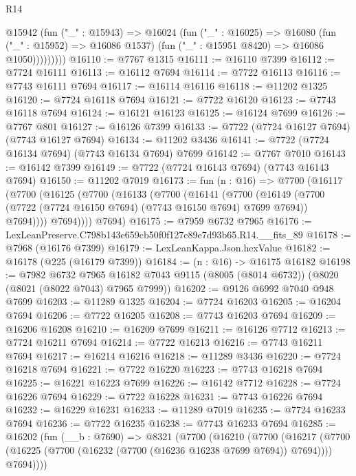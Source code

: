 \begin{lexlean}{R14}
\begin{coremodule}
              @15942
                (fun ("_" : @15943) =>
                @16024
                  (fun ("_" : @16025) =>
                  @16080
                    (fun ("_" : @15952) => @16086 @1537)
                    (fun ("_" : @15951 @8420) => @16086 @1050)))))))))
@16110 := @7767 @1315
@16111 := @16110 @7399
@16112 := @7724 @16111
@16113 := @16112 @7694
@16114 := @7722 @16113
@16116 := @7743 @16111 @7694
@16117 := @16114 @16116
@16118 := @11202 @1325
@16120 := @7724 @16118 @7694
@16121 := @7722 @16120
@16123 := @7743 @16118 @7694
@16124 := @16121 @16123
@16125 := @16124 @7699
@16126 := @7767 @801
@16127 := @16126 @7399
@16133 := @7722 (@7724 @16127 @7694) (@7743 @16127 @7694)
@16134 := @11202 @3436
@16141 := @7722 (@7724 @16134 @7694) (@7743 @16134 @7694) @7699
@16142 := @7767 @7010
@16143 := @16142 @7399
@16149 := @7722 (@7724 @16143 @7694) (@7743 @16143 @7694)
@16150 := @11202 @7019
@16173 := fun (n : @16) =>
  @7700
    (@16117
      (@7700
        (@16125
          (@7700
            (@16133
              (@7700
                (@16141
                  (@7700
                    (@16149
                      (@7700 (@7722 (@7724 @16150 @7694) (@7743 @16150 @7694) @7699 @7694))
                      @7694))))
              @7694))))
      @7694)
@16175 := @7959 @6732 @7965
@16176 := LexLeanPreserve.C798b143e659cb50f0f127c89e7d93b65.R14.__fits_89
@16178 := @7968 (@16176 @7399)
@16179 := LexLeanKappa.Json.hexValue
@16182 := @16178 (@225 (@16179 @7399))
@16184 := (n : @16) -> @16175 @16182
@16198 := @7982
    @6732
    @7965
    @16182
    @7043
    @9115
    (@8005 (@8014 @6732))
    (@8020 (@8021 (@8022 @7043) @7965 @7999))
@16202 := @9126 @6992 @7040 @948 @7699
@16203 := @11289 @1325
@16204 := @7724 @16203
@16205 := @16204 @7694
@16206 := @7722 @16205
@16208 := @7743 @16203 @7694
@16209 := @16206 @16208
@16210 := @16209 @7699
@16211 := @16126 @7712
@16213 := @7724 @16211 @7694
@16214 := @7722 @16213
@16216 := @7743 @16211 @7694
@16217 := @16214 @16216
@16218 := @11289 @3436
@16220 := @7724 @16218 @7694
@16221 := @7722 @16220
@16223 := @7743 @16218 @7694
@16225 := @16221 @16223 @7699
@16226 := @16142 @7712
@16228 := @7724 @16226 @7694
@16229 := @7722 @16228
@16231 := @7743 @16226 @7694
@16232 := @16229 @16231
@16233 := @11289 @7019
@16235 := @7724 @16233 @7694
@16236 := @7722 @16235
@16238 := @7743 @16233 @7694
@16285 := @16202
    (fun (__b : @7690) =>
    @8321
      (@7700
        (@16210
          (@7700
            (@16217
              (@7700 (@16225 (@7700 (@16232 (@7700 (@16236 @16238 @7699 @7694)) @7694))))
              @7694))))

\end{coremodule}
\end{lexlean}
